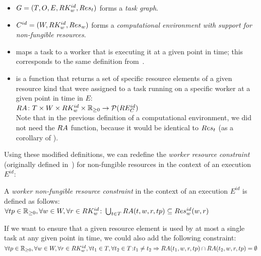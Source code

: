 \begin{itemize}[itemsep=0pt]
	\item $G = (T, O, E, RK_w^{id}, Res_t)$ forms a \emph{task graph}.
	\item $C^{id} = (W, RK_w^{id}, Res_w)$ forms a \emph{computational environment with support for non-fungible resources}.
	\item \fntaskworkerassigned{} maps a task to a worker that is executing it at a given point in time; this
	      corresponds to the same definition from~.
	\item \fntaskresassigned{} is a function that returns a set of specific resource elements of a
	      given resource kind that were assigned to a task running on a specific worker at a given point in
	      time in $E$: \\ $RA\colon T \times W \times RK_w^{id} \times \mathbb{R}_{\geq{}0} \rightarrow
		      \mathcal{P}(RE_C^{id})$ \vspace{2mm}\\ Note that in the
	      previous definition of a computational environment, we did not need the $RA$
	      function, because it would be identical to $Res_t$ (as a corollary of
	      ).
\end{itemize}

Using these modified definitions, we can redefine the \emph{worker resource constraint} (originally defined in~) for non-fungible
resources in the context of an execution $E^{id}$:

\vspace{2mm} A
\emph{worker non-fungible resource constraint} in the context of an execution $E^{id}$ is
defined as follows: \\ $\forall tp\in\mathbb{R}_{\geq{}0}, \forall w\in{}W, \forall
	r\in{}RK_w^{id}\colon \bigcup_{t\in{}T}
	RA(t, w, r, tp) \subseteq Res_w^{id}(w, r)$

\vspace{2mm}If we want to ensure that a given resource element is used by at most a
single task at any given
point in time, we could also add the following constraint: \vspace{2mm}\\
$\forall tp\in\mathbb{R}_{\geq{}0}, \forall w\in{}W, \forall
	r\in{}RK_w^{id}, \forall t_1\in{}T, \forall
	t_2\in{}T\colon \\t_1 \neq t_2 \Rightarrow RA(t_1, w, r, tp) \cap
	RA(t_2, w, r, tp) = \emptyset$ \\

